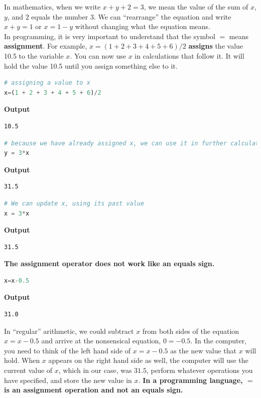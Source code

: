 In mathematics, when we write $x+y+2=3$, we mean the value of the sum of $x$, $y$, and $2$ equals the number $3$. We can ``rearrange'' the equation and write $x + y = 1$ or $x = 1 - y$ without changing what the equation means. \\

In programming, it is very important to understand that the symbol $=$ means \textbf{assignment}. For example, $x=(1 + 2 + 3 + 4 + 5 + 6)/2$ \textbf{assigns} the value 10.5 to the variable $x$. You can now use $x$ in calculations that follow it. It will hold the value 10.5 until you assign something else to it.

\begin{lstlisting}[language=Julia,style=mystyle]
# assigning a value to x
x=(1 + 2 + 3 + 4 + 5 + 6)/2
\end{lstlisting}
\textbf{Output} 
\begin{verbatim}
10.5
\end{verbatim}

\begin{lstlisting}[language=Julia,style=mystyle]
# because we have already assigned x, we can use it in further calculations
y = 3*x
\end{lstlisting}
\textbf{Output} 
\begin{verbatim}
31.5
\end{verbatim}


\begin{lstlisting}[language=Julia,style=mystyle]
# We can update x, using its past value
x = 3*x
\end{lstlisting}
\textbf{Output} 
\begin{verbatim}
31.5
\end{verbatim}

\textbf{The assignment operator does not work like an equals sign.}
\begin{lstlisting}[language=Julia,style=mystyle]
x=x-0.5
\end{lstlisting}
\textbf{Output} 
\begin{verbatim}
31.0
\end{verbatim}
In ``regular'' arithmetic, we could subtract $x$ from both sides of the equation $x=x-0.5$ and arrive at the nonsensical equation, $0=-0.5$. In the computer, you need to think of the left hand side of $x=x-0.5$ as the new value that $x$ will hold. When $x$ appears on the right hand side as well, the computer will use the current value of $x$, which in our case, was $31.5$, perform whatever operations you have specified, and store the new value in $x$. \textbf{In a programming language, $=$ is an assignment operation and not an equals sign.}\\

